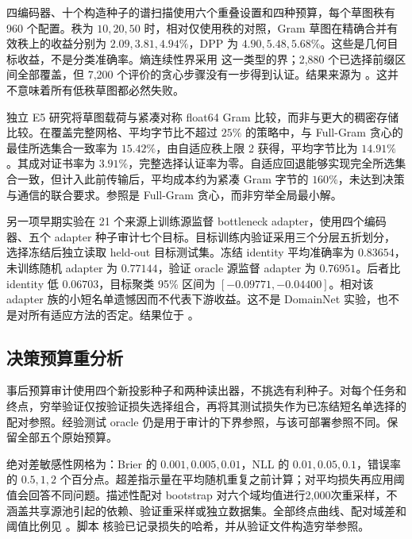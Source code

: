 四编码器、十个构造种子的谱扫描使用六个重叠设置和四种预算，每个草图秩有 960 个配置。秩为 $10,20,50$ 时，相对仅使用秩的对照，Gram 草图在精确合并有效秩上的收益分别为 $2.09,3.81,4.94\%$，DPP 为 $4.90,5.48,5.68\%$。这些是几何目标收益，不是分类准确率。熵连续性界采用\citet{audenaert2007} 这一类型的界；2,880 个已选择前缀区间全部覆盖，但 7,200 个评价的贪心步骤没有一步得到认证。结果来源为 。这并不意味着所有低秩草图都必然失败。

独立 E5 研究将草图载荷与紧凑对称 float64 Gram 比较，而非与更大的稠密存储比较。在覆盖完整网格、平均字节比不超过 $25\%$ 的策略中，与 Full-Gram 贪心的最佳所选集合一致率为 $15.42\%$，由自适应秩上限 2 获得，平均字节比为 $14.91\%$。其成对证书率为 $3.91\%$，完整选择认证率为零。自适应回退能够实现完全所选集合一致，但计入此前传输后，平均成本约为紧凑 Gram 字节的 $160\%$，未达到决策与通信的联合要求。参照是 Full-Gram 贪心，而非穷举全局最小解。

另一项早期实验在 21 个来源上训练源监督 bottleneck adapter，使用四个编码器、五个 adapter 种子审计七个目标。目标训练内验证采用三个分层五折划分，选择冻结后独立读取 held-out 目标测试集。冻结 identity 平均准确率为 $0.83654$，未训练随机 adapter 为 $0.77144$，验证 oracle 源监督 adapter 为 $0.76951$。后者比 identity 低 $0.06703$，目标聚类 95\% 区间为 $[-0.09771,-0.04400]$。相对该 adapter 族的小短名单遗憾因而不代表下游收益。这不是 DomainNet 实验，也不是对所有适应方法的否定。结果位于 。

\subsection{决策预算重分析}
\label{app:budget}
事后预算审计使用四个新投影种子和两种读出器，不挑选有利种子。对每个任务和终点，穷举验证仅按验证损失选择组合，再将其测试损失作为已冻结短名单选择的配对参照。经验测试 oracle 仍是用于审计的下界参照，与该可部署参照不同。保留全部五个原始预算。

\begin{table}[ht]
\centering
\caption{表中报告逻辑回归的最终 Brier 及超过穷举验证参照 $0.005$ 的比例。先平均随机重复，再在域内平均编码器和种子，最后对六域平均。容忍值属于探索性分析，不是新成功门槛。}
\label{app:budget-table}

\end{table}

绝对差敏感性网格为：Brier 的 $0.001,0.005,0.01$，NLL 的 $0.01,0.05,0.1$，错误率的 $0.5,1,2$ 个百分点。超差指示量在平均随机重复之前计算；对平均损失再应用阈值会回答不同问题。描述性配对 bootstrap 对六个域均值进行2,000次重采样，不涵盖共享源池引起的依赖、验证重采样或独立数据集。全部终点曲线、配对域差和阈值比例见 。脚本  核验已记录损失的哈希，并从验证文件构造穷举参照。

